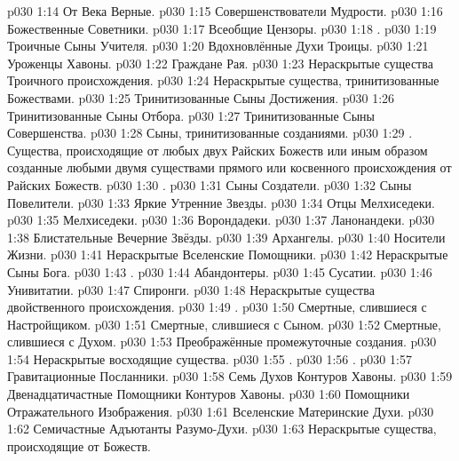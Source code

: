 \vs p030 1:14 От Века Верные.
\vs p030 1:15 Совершенствователи Мудрости.
\vs p030 1:16 Божественные Советники.
\vs p030 1:17 Всеобщие Цензоры.
\vs p030 1:18 .
\vs p030 1:19 Троичные Сыны Учителя.
\vs p030 1:20 Вдохновлённые Духи Троицы.
\vs p030 1:21 Уроженцы Хавоны.
\vs p030 1:22 Граждане Рая.
\vs p030 1:23 Нераскрытые существа Троичного происхождения.
\vs p030 1:24 Нераскрытые существа, тринитизованные Божествами.
\vs p030 1:25 Тринитизованные Сыны Достижения.
\vs p030 1:26 Тринитизованные Сыны Отбора.
\vs p030 1:27 Тринитизованные Сыны Совершенства.
\vs p030 1:28 Сыны, тринитизованные созданиями.
\vs p030 1:29 . Существа, происходящие от любых двух Райских Божеств или иным образом созданные любыми двумя существами прямого или косвенного происхождения от Райских Божеств.
\vs p030 1:30 .
\vs p030 1:31 Сыны Создатели.
\vs p030 1:32 Сыны Повелители.
\vs p030 1:33 Яркие Утренние Звезды.
\vs p030 1:34 Отцы Мелхиседеки.
\vs p030 1:35 Мелхиседеки.
\vs p030 1:36 Ворондадеки.
\vs p030 1:37 Ланонандеки.
\vs p030 1:38 Блистательные Вечерние Звёзды.
\vs p030 1:39 Архангелы.
\vs p030 1:40 Носители Жизни.
\vs p030 1:41 Нераскрытые Вселенские Помощники.
\vs p030 1:42 Нераскрытые Сыны Бога.
\vs p030 1:43 .
\vs p030 1:44 Абандонтеры.
\vs p030 1:45 Сусатии.
\vs p030 1:46 Унивитатии.
\vs p030 1:47 Спиронги.
\vs p030 1:48 Нераскрытые существа двойственного происхождения.
\vs p030 1:49 .
\vs p030 1:50 Смертные, слившиеся с Настройщиком.
\vs p030 1:51 Смертные, слившиеся с Сыном.
\vs p030 1:52 Смертные, слившиеся с Духом.
\vs p030 1:53 Преображённые промежуточные создания.
\vs p030 1:54 Нераскрытые восходящие существа.
\vs p030 1:55 .
\vs p030 1:56 .
\vs p030 1:57 Гравитационные Посланники.
\vs p030 1:58 Семь Духов Контуров Хавоны.
\vs p030 1:59 Двенадцатичастные Помощники Контуров Хавоны.
\vs p030 1:60 Помощники Отражательного Изображения.
\vs p030 1:61 Вселенские Материнские Духи.
\vs p030 1:62 Семичастные Адъютанты Разумо\hyp{}Духи.
\vs p030 1:63 Нераскрытые существа, происходящие от Божеств.
